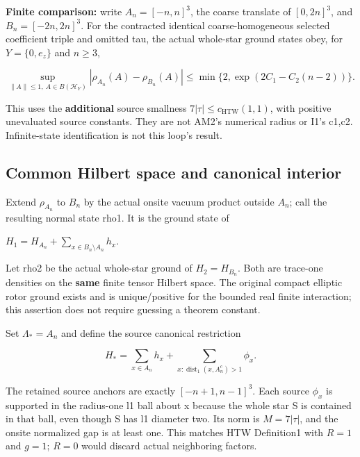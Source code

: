 \textbf{Finite comparison:} write \(A_n=[-n,n]^{3}\), the coarse translate of \([0,2n]^{3}\), and \(B_n=[-2n,2n]^{3}\). For the contracted identical coarse-homogeneous selected coefficient triple and omitted tau, the actual whole-star ground states obey, for \(Y=\{0,e_z\}\) and \(n\ge 3\),

\begin{equation}
\sup_{\|A\|\le1,\ A\in B(\mathcal H_Y)}
|\rho_{A_n}(A)-\rho_{B_n}(A)|
\le\min\{2,\exp(2C_1-C_2(n-2))\}.
\tag{HNM-AN1.1}
\label{r29:an1:eq1}
\end{equation}

This uses the \textbf{additional} source smallness \(7|\tau|\le c_{\mathrm{HTW}}(1,1)\), with positive unevaluated source constants. They are not AM2's numerical radius or I1's c1,c2. Infinite-state identification is not this loop's result.

\hypertarget{r29-an1-common-hilbert-space-and-canonical-interior}{%
\subsection{Common Hilbert space and canonical interior}\label{r29:an1:r29-an1-common-hilbert-space-and-canonical-interior}}

Extend \(\rho_{A_n}\) to \(B_n\) by the actual onsite vacuum product outside \(A_n\); call the resulting normal state rho1. It is the ground state of

\(H_1=H_{A_n}+\sum_{x\in B_n\setminus A_n}h_x\).

Let rho2 be the actual whole-star ground of \(H_2=H_{B_n}\). Both are trace-one densities on the \textbf{same} finite tensor Hilbert space. The original compact elliptic rotor ground exists and is unique/positive for the bounded real finite interaction; this assertion does not require guessing a theorem constant.

Set \(\Lambda_*=A_n\) and define the source canonical restriction

\begin{equation}
H_*=\sum_{x\in A_n}h_x+
\sum_{x:\operatorname{dist}_1(x,A_n^c)>1}\phi_x.
\tag{HNM-AN1.2}
\label{r29:an1:eq2}
\end{equation}

The retained source anchors are exactly \([-n+1,n-1]^{3}\). Each source \(\phi_x\) is supported in the radius-one l1 ball about x because the whole star S is contained in that ball, even though S has l1 diameter two. Its norm is \(M=7|\tau|\), and the onsite normalized gap is at least one. This matches HTW Definition1 with \(R=1\) and \(g=1\); \(R=0\) would discard actual neighboring factors.


